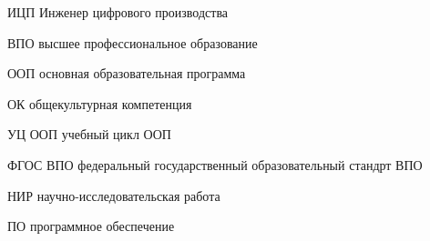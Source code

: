 
\begin{description}
\item{ИЦП} Инженер цифрового производства
\bigskip
\item{ВПО} высшее профессиональное образование
\item{ООП} основная образовательная программа
\item{ОК} общекультурная компетенция
\item{УЦ ООП} учебный цикл ООП
\item{ФГОС ВПО} федеральный государственный образовательный стандрт ВПО
\bigskip
\item{НИР} научно-исследовательская работа
\item{ПО} программное обеспечение
\end{description}